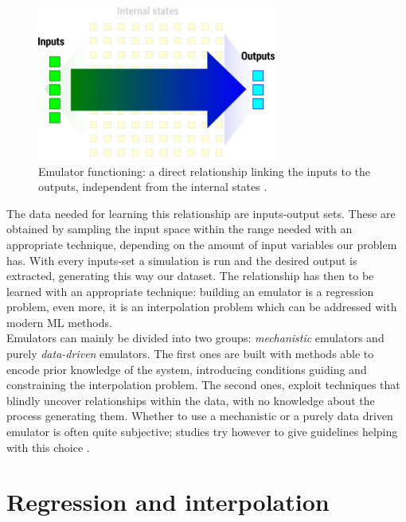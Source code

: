 \begin{figure}[h]
  \centering
  \includegraphics[width=0.7\textwidth]{Figures/emulation.png}
  \caption{Emulator functioning: a direct relationship linking the inputs to the outputs, independent from the internal states \autocite{carbajal_emumore_2017}.}
  \label{fig:emulation}
\end{figure}

The data needed for learning this relationship are inputs-output sets.
These are obtained by sampling the input space within the range needed with an appropriate technique, depending on the amount of input variables our problem has.
With every inputs-set a simulation is run and the desired output is extracted, generating this way our dataset.
The relationship has then to be learned with an appropriate technique: building an emulator is a regression problem, even more, it is an interpolation problem \autocite{carbajal_emumore_2017} which can be addressed with modern ML methods.\\

Emulators can mainly be divided into two groups: \emph{mechanistic} emulators and purely \emph{data-driven} emulators.
The first ones are built with methods able to encode prior knowledge of the system, introducing conditions guiding and constraining the interpolation problem.
The second ones, exploit techniques that blindly uncover relationships within the data, with no knowledge about the process generating them.
Whether to use a mechanistic or a purely data driven emulator is often quite subjective; studies try however to give guidelines helping with this choice \autocite{carbajal_appraisal_2016}.



\section{Regression and interpolation}

